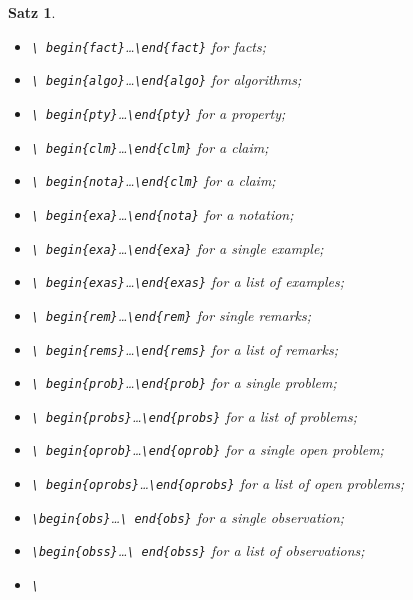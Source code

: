 \documentclass{CSLM} %
\theoremstyle{plain}\newtheorem{satz}[thm]{Satz} %
\begin{document}
\begin{satz}
\begin{itemize}
\begin{itemize}
{{    begin\{conj\}}\dots\texttt{\textbackslash end\{conj\}}} for a conjecture;
\item\emph{\texttt{\textbackslash
    begin\{fact\}}\dots\texttt{\textbackslash end\{fact\}}} for facts;
\item\emph{\texttt{\textbackslash
    begin\{algo\}}\dots\texttt{\textbackslash end\{algo\}}} for algorithms;
\item\emph{\texttt{\textbackslash
    begin\{pty\}}\dots\texttt{\textbackslash end\{pty\}}} for a property;
\item\emph{\texttt{\textbackslash
    begin\{clm\}}\dots\texttt{\textbackslash end\{clm\}}} for a claim;
\item\emph{\texttt{\textbackslash
    begin\{nota\}}\dots\texttt{\textbackslash end\{clm\}}} for a claim;
\item\emph{\texttt{\textbackslash
    begin\{exa\}}\dots\texttt{\textbackslash end\{nota\}}} for a notation;
\item\emph{\texttt{\textbackslash
    begin\{exa\}}\dots\texttt{\textbackslash end\{exa\}}} for a single example;
\item\emph{\texttt{\textbackslash
    begin\{exas\}}\dots\texttt{\textbackslash end\{exas\}}} for a list of examples;
\item\emph{\texttt{\textbackslash
    begin\{rem\}}\dots\texttt{\textbackslash end\{rem\}}} for single remarks;
\item\emph{\texttt{\textbackslash
    begin\{rems\}}\dots\texttt{\textbackslash end\{rems\}}} for a list of remarks;
\item\emph{\texttt{\textbackslash
    begin\{prob\}}\dots\texttt{\textbackslash end\{prob\}}} for a
  single problem;
\item\emph{\texttt{\textbackslash
  begin\{probs\}}\dots\texttt{\textbackslash end\{probs\}}} for a list
  of problems;
\item\emph{\texttt{\textbackslash
    begin\{oprob\}}\dots\texttt{\textbackslash end\{oprob\}}} for a single open problem;
\item\emph{\texttt{\textbackslash
    begin\{oprobs\}}\dots\texttt{\textbackslash end\{oprobs\}}} for a
  list of open problems;
\item\emph{\texttt{\textbackslash begin\{obs\}}\dots\texttt{\textbackslash
  end\{obs\}}} for a single observation;
\item\emph{\texttt{\textbackslash begin\{obss\}}\dots\texttt{\textbackslash
  end\{obss\}}} for a list of observations;
\item\emph{\texttt{\textbackslash
}}
\end{itemize}
\end{itemize}
\end{satz}
\end{document}
